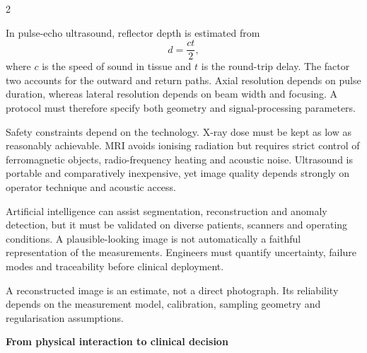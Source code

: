 \begin{multicols}{2}
\begin{ecarticle}
In pulse-echo ultrasound, reflector depth is estimated from
\[
d=\frac{ct}{2},
\]
where $c$ is the speed of sound in tissue and $t$ is the round-trip delay. The factor two accounts for the outward
and return paths. Axial resolution depends on pulse duration, whereas lateral resolution depends on beam width
and focusing. A protocol must therefore specify both geometry and signal-processing parameters.

Safety constraints depend on the technology. X-ray dose must be kept as low as reasonably achievable. MRI
avoids ionising radiation but requires strict control of ferromagnetic objects, radio-frequency heating and
acoustic noise. Ultrasound is portable and comparatively inexpensive, yet image quality depends strongly on
operator technique and acoustic access.

Artificial intelligence can assist segmentation, reconstruction and anomaly detection, but it must be validated
on diverse patients, scanners and operating conditions. A plausible-looking image is not automatically a faithful
representation of the measurements. Engineers must quantify uncertainty, failure modes and traceability before
clinical deployment.
\end{ecarticle}

\begin{tcolorbox}[title=\sffamily\bfseries Engineering insight,colback=yellow!10,colframe=ECOrange]
A reconstructed image is an estimate, not a direct photograph. Its reliability depends on the measurement model,
calibration, sampling geometry and regularisation assumptions.
\end{tcolorbox}

\begin{engineeringfocus}
\textbf{From physical interaction to clinical decision}
\begin{center}
\end{center}
\end{engineeringfocus}


\end{multicols}
